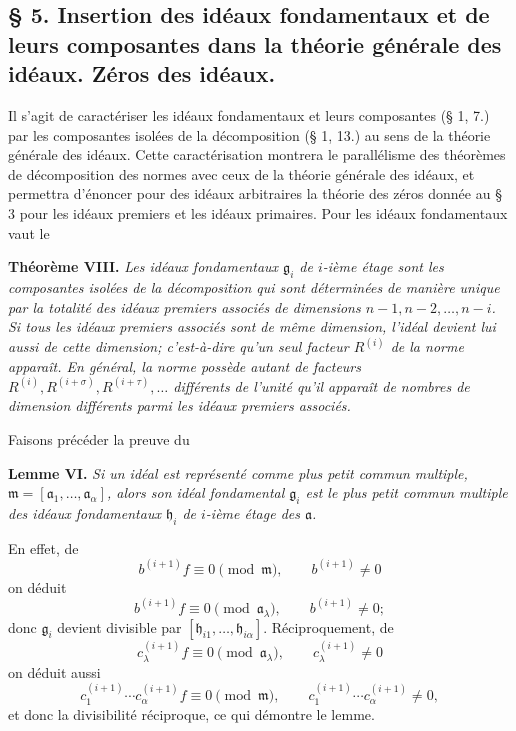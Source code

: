 \providecommand{\fraka}{\mathfrak a}
\providecommand{\frakg}{\mathfrak g}
\providecommand{\frakh}{\mathfrak h}
\providecommand{\frakm}{\mathfrak m}
\providecommand{\frako}{\mathfrak o}
\providecommand{\frakp}{\mathfrak p}
\providecommand{\frakq}{\mathfrak q}
\providecommand{\frakr}{\mathfrak r}
\providecommand{\frakt}{\mathfrak t}

\subsection*{\S{} 5. Insertion des idéaux fondamentaux et de leurs composantes dans la théorie générale des idéaux. Zéros des idéaux.}

Il s'agit de caractériser les idéaux fondamentaux et leurs composantes (\S{} 1, 7.) par les composantes isolées de la décomposition (\S{} 1, 13.) au sens de la théorie générale des idéaux. Cette caractérisation montrera le parallélisme des théorèmes de décomposition des normes avec ceux de la théorie générale des idéaux, et permettra d'énoncer pour des idéaux arbitraires la théorie des zéros donnée au \S{} 3 pour les idéaux premiers et les idéaux primaires. Pour les idéaux fondamentaux vaut le

\textbf{Théorème VIII.} \emph{Les idéaux fondamentaux $\frakg_i$ de $i$-ième étage sont les composantes isolées de la décomposition qui sont déterminées de manière unique par la totalité des idéaux premiers associés de dimensions $n-1,n-2,\ldots,n-i$. Si tous les idéaux premiers associés sont de même dimension, l'idéal devient lui aussi de cette dimension; c'est-à-dire qu'un seul facteur $R^{(i)}$ de la norme apparaît. En général, la norme possède autant de facteurs $R^{(i)},R^{(i+\sigma)},R^{(i+\tau)},\ldots$ différents de l'unité qu'il apparaît de nombres de dimension différents parmi les idéaux premiers associés.}

Faisons précéder la preuve du

\textbf{Lemme VI.} \emph{Si un idéal est représenté comme plus petit commun multiple, $\frakm=[\fraka_1,\ldots,\fraka_\alpha]$, alors son idéal fondamental $\frakg_i$ est le plus petit commun multiple des idéaux fondamentaux $\frakh_i$ de $i$-ième étage des $\fraka$.}

En effet, de
\[
 b^{(i+1)}f\equiv0\pmod{\frakm},\qquad b^{(i+1)}\ne0
\]
on déduit
\[
 b^{(i+1)}f\equiv0\pmod{\fraka_\lambda},\qquad b^{(i+1)}\ne0;
\]
donc $\frakg_i$ devient divisible par $[\frakh_{i1},\ldots,\frakh_{i\alpha}]$. Réciproquement, de
\[
 c_\lambda^{(i+1)}f\equiv0\pmod{\fraka_\lambda},\qquad c_\lambda^{(i+1)}\ne0
\]
on déduit aussi
\[
 c_1^{(i+1)}\cdots c_\alpha^{(i+1)}f\equiv0\pmod{\frakm},\qquad
 c_1^{(i+1)}\cdots c_\alpha^{(i+1)}\ne0,
\]
et donc la divisibilité réciproque, ce qui démontre le lemme.

